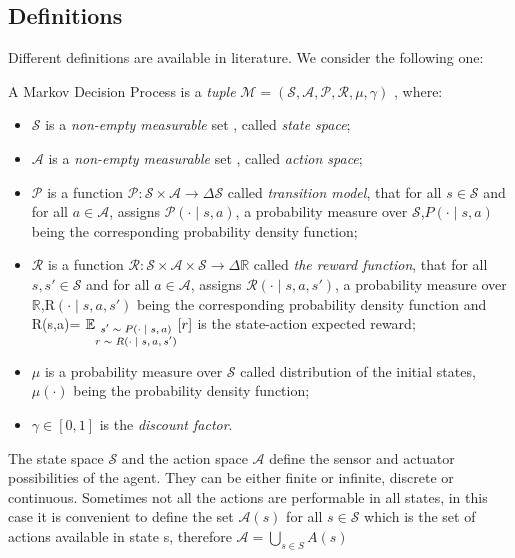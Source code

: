 \subsection{Definitions}
Different definitions are available in literature. We consider the following one:
\begin{definition}
	A Markov Decision Process is a \emph{tuple} $\mathcal{M= (S, A, P, R, \mu, \gamma)}$ ,
where:
\end{definition}
\begin{itemize}
\item $\mathcal{S}$ is a \emph{non-empty measurable} set , called \emph{state space};
\item $\mathcal{A}$ is a \emph{non-empty measurable} set , called \emph{action space};
\item $\mathcal{P}$ is a function $\mathcal{P: S\times A\rightarrow}\Delta \mathcal{S}$ called \emph{transition model}, that for all  $s \mathcal{ \in S}$ and for all  $a\mathcal{\in A}$, assigns $\mathcal{P}(\cdot\mid s,a)$, a probability measure over $\mathcal{S}$,$P(\cdot\mid s,a)$ being the corresponding probability density function;
\item $\mathcal{R}$ is a function $\mathcal{R: S\times A \times S\rightarrow \Delta \mathbb{R}}$ called \emph{the reward function}, that for all  $s,s' \mathcal{ \in S}$ and for all  $a\mathcal{\in A}$, assigns $\mathcal{R}(\cdot\mid s,a,s')$, a probability measure over $\mathbb{R}$,R$(\cdot\mid s,a,s')$ being the corresponding probability density function and R(s,a)= $\mathbb{E}_{\substack{\text{$ s'\sim P(\cdot\mid s,a)$} \\ \text{$r \sim R(\cdot\mid s,a,s')$}}} [r] $ is the state-action expected reward;
\item $\mu$ is a probability measure over $\mathcal{S}$ called distribution of the initial states, $\mu(\cdot)$ being the probability density function;
\item $\gamma \in [0,1]$ is the \emph{discount factor}. 
\end{itemize} \par
The state space $\mathcal{S}$ and the action space $\mathcal{A}$ define the sensor and actuator possibilities of the agent. They can be either finite or infinite, discrete or continuous. Sometimes not all the actions are performable in all states, in this case it is convenient to define the set $\mathcal{A}(s)$ for all $s\mathcal{ \in S}$ which is the set of actions available in state s, therefore $\mathcal{A}= \bigcup_{s∈S}A(s)$\par
